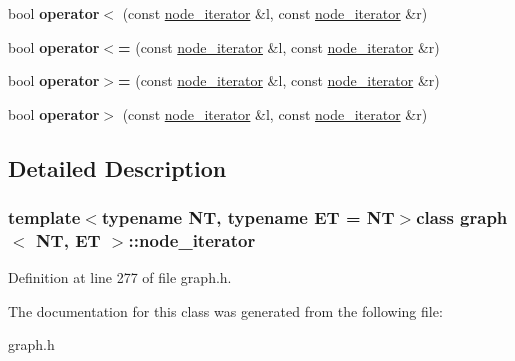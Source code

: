 \begin{DoxyCompactItemize}
\item 
\hypertarget{classgraph_1_1node__iterator_a545664b456b4e3c268ad91fec9e530b5}{bool {\bfseries operator$<$} (const \hyperlink{classgraph_1_1node__iterator}{node\+\_\+iterator} \&l, const \hyperlink{classgraph_1_1node__iterator}{node\+\_\+iterator} \&r)}\label{classgraph_1_1node__iterator_a545664b456b4e3c268ad91fec9e530b5}

\item 
\hypertarget{classgraph_1_1node__iterator_a538fbcfacacb3cf1ac7d3041b3342dc3}{bool {\bfseries operator$<$=} (const \hyperlink{classgraph_1_1node__iterator}{node\+\_\+iterator} \&l, const \hyperlink{classgraph_1_1node__iterator}{node\+\_\+iterator} \&r)}\label{classgraph_1_1node__iterator_a538fbcfacacb3cf1ac7d3041b3342dc3}

\item 
\hypertarget{classgraph_1_1node__iterator_a5d35f6f6fdf2dfeb5a7cdac7649b216f}{bool {\bfseries operator$>$=} (const \hyperlink{classgraph_1_1node__iterator}{node\+\_\+iterator} \&l, const \hyperlink{classgraph_1_1node__iterator}{node\+\_\+iterator} \&r)}\label{classgraph_1_1node__iterator_a5d35f6f6fdf2dfeb5a7cdac7649b216f}

\item 
\hypertarget{classgraph_1_1node__iterator_a74e84d83365092b345464ea91fc1b46c}{bool {\bfseries operator$>$} (const \hyperlink{classgraph_1_1node__iterator}{node\+\_\+iterator} \&l, const \hyperlink{classgraph_1_1node__iterator}{node\+\_\+iterator} \&r)}\label{classgraph_1_1node__iterator_a74e84d83365092b345464ea91fc1b46c}

\end{DoxyCompactItemize}


\subsection{Detailed Description}
\subsubsection*{template$<$typename N\+T, typename E\+T = N\+T$>$class graph$<$ N\+T, E\+T $>$\+::node\+\_\+iterator}



Definition at line 277 of file graph.\+h.



The documentation for this class was generated from the following file\+:\begin{DoxyCompactItemize}
\item 
graph.\+h\end{DoxyCompactItemize}
